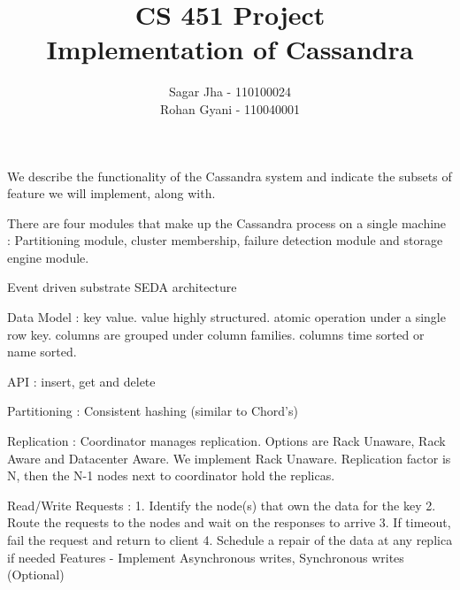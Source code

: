 \documentclass {article}
\title {CS 451 Project \\Implementation of Cassandra}
\author {Sagar Jha - 110100024\\ Rohan Gyani - 110040001}
\begin{document}
\maketitle

We describe the functionality of the Cassandra system and indicate the subsets of feature we will implement, along with.

There are four modules that make up the Cassandra process on a single machine : Partitioning module, cluster membership, failure detection module and storage engine module.

Event driven substrate SEDA architecture

Data Model :
key value. value highly structured. atomic operation under a single row key. columns are grouped under column families. columns time sorted or name sorted.

API :
insert, get and delete

Partitioning :
Consistent hashing (similar to Chord's)

Replication :
Coordinator manages replication. Options are Rack Unaware, Rack Aware and Datacenter Aware. We implement Rack Unaware. Replication factor is N, then the N-1 nodes next to coordinator hold the replicas.

Read/Write Requests : 
1. Identify the node(s) that own the data for the key
2. Route the requests to the nodes and wait on the responses to arrive
3. If timeout, fail the request and return to client
4. Schedule a repair of the data at any replica if needed
 Features - Implement Asynchronous writes, Synchronous writes (Optional)
\end{document}
